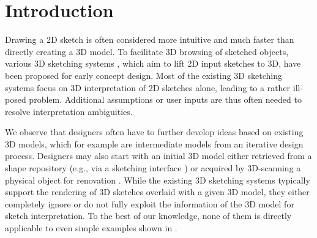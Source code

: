 \section{Introduction}

Drawing a 2D sketch is often considered more intuitive and much faster than directly creating a 3D model. To facilitate 3D browsing of sketched objects, various 3D sketching systems \cite{dorsey2007mental,bae2008ilovesketch,Zheng2016}, which aim to lift 2D input sketches to 3D, have been proposed for early concept design. Most of the existing 3D sketching systems focus on 3D interpretation of 2D sketches alone, leading to a rather ill-posed problem. Additional assumptions or user inputs are thus often needed to resolve interpretation ambiguities.

We observe that designers often have to further develop ideas based on existing 3D models, which for example are intermediate models from an iterative design process. Designers may also start with an initial 3D model either retrieved from a shape repository (e.g., via a sketching interface \cite{Eitz:2012a}) or acquired by 3D-scanning a physical object for renovation \cite{Chen2015}. While the existing 3D sketching systems typically support the rendering of 3D sketches overlaid with a given 3D model, they either completely ignore or do not fully exploit the information of the 3D model for sketch interpretation. To the best of our knowledge, none of them is directly applicable to even simple examples shown in .





